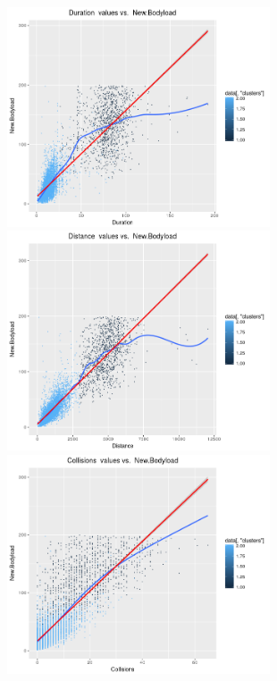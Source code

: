\begin{figure}[h]
	\centering
	\begin{minipage}{.33\textwidth}
		\centering
		\includegraphics[width=\linewidth, height=6.5cm]{Images/DurationvsNBL.png}
		\captionsetup{width=.8\linewidth}
	\end{minipage}%
	\hfill
	\begin{minipage}{.33\textwidth}
		\centering
		\includegraphics[width=\linewidth, height=6.5cm]{Images/DistancevsNBL.png}
		\captionsetup{width=.8\linewidth}
	\end{minipage} %
	\hfill
	\begin{minipage}{.33\textwidth}
		\centering
		\includegraphics[width=\linewidth, height=6.5cm]{Images/CollisionsvsNBL.png}

\end{minipage}
\end{figure}
